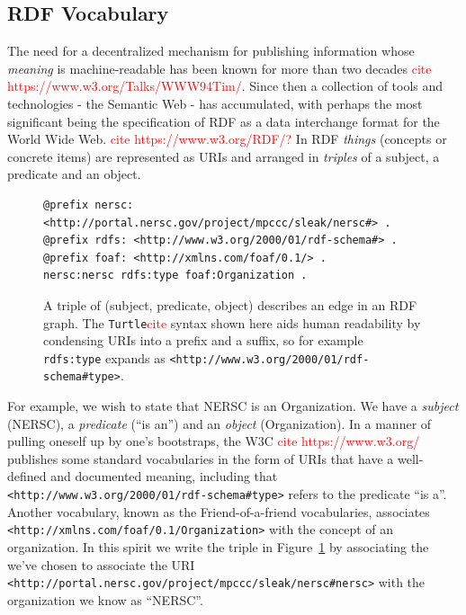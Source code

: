 \subsection{RDF Vocabulary}

The need for a decentralized mechanism for publishing information whose 
\emph{meaning} is machine-readable has been known for more than two decades
\textcolor{red}{cite https://www.w3.org/Talks/WWW94Tim/}. Since then a 
collection of tools and technologies - the Semantic Web - has accumulated, with
perhaps the most significant being the specification of RDF as a data 
interchange format for the World Wide Web. \textcolor{red}{cite https://www.w3.org/RDF/?}
In RDF \emph{things} (concepts or concrete items) are represented as URIs
and arranged in \emph{triples} of a subject, a predicate and an object. 

\begin{figure}
\begin{verbatim}
@prefix nersc: <http://portal.nersc.gov/project/mpccc/sleak/nersc#> .
@prefix rdfs: <http://www.w3.org/2000/01/rdf-schema#> .
@prefix foaf: <http://xmlns.com/foaf/0.1/> .
nersc:nersc rdfs:type foaf:Organization .
\end{verbatim}

\caption{A triple of (subject, predicate, object) describes an edge 
in an RDF graph. The \texttt{Turtle}\textcolor{red}{cite} syntax shown
here aids human readability by condensing URIs into a prefix and a suffix,
so for example \texttt{rdfs:type} expands as
\texttt{<http://www.w3.org/2000/01/rdf-schema\#type>}.}
\label{f:rdftriples}
\end{figure}

For example, we wish to state that NERSC is an Organization. We have a 
\emph{subject} (NERSC), a \emph{predicate} (``is an'') and an \emph{object} 
(Organization). In a manner of pulling oneself up by one's bootstraps, the 
W3C \textcolor{red}{cite https://www.w3.org/} publishes some standard 
vocabularies in the form of URIs that have a well-defined and documented 
meaning, including that \texttt{<http://www.w3.org/2000/01/rdf-schema\#type>}
refers to the predicate ``is a''. Another vocabulary, known as the 
Friend-of-a-friend vocabularies, associates \texttt{<http://xmlns.com/foaf/0.1/Organization>} with the concept of an 
organization. In this spirit we write the triple in Figure~\ref{f:rdftriples}
by associating the 
we've chosen to associate the URI \texttt{<http://portal.nersc.gov/project/mpccc/sleak/nersc\#nersc>} with the 
organization we know as ``NERSC''. 

